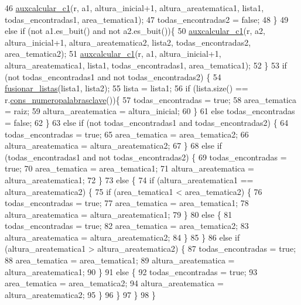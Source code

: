 \begin{DoxyCode}
46       \hyperlink{class_esquema_a77210c8349dc7dccbaa8224c2da4e50e}{auxcalcular\_c1}(r, a1, altura\_inicial+1, altura\_areatematica1, lista1, 
      todas\_encontradas1, area\_tematica1); 
47       todas\_encontradas2 = \textcolor{keyword}{false};
48   \}
49   \textcolor{keywordflow}{else} \textcolor{keywordflow}{if} (not a1.es\_buit() and not a2.es\_buit())\{
50       \hyperlink{class_esquema_a77210c8349dc7dccbaa8224c2da4e50e}{auxcalcular\_c1}(r, a2, altura\_inicial+1, altura\_areatematica2, lista2, 
      todas\_encontradas2, area\_tematica2);
51       \hyperlink{class_esquema_a77210c8349dc7dccbaa8224c2da4e50e}{auxcalcular\_c1}(r, a1, altura\_inicial+1, altura\_areatematica1, lista1, 
      todas\_encontradas1, area\_tematica1); 
52   \}
53   \textcolor{keywordflow}{if} (not todas\_encontradas1 and not todas\_encontradas2) \{
54       \hyperlink{class_esquema_abf74b66701d3ab70316d8740cdd0bc25}{fusionar\_listas}(lista1, lista2);
55       lista = lista1;
56       \textcolor{keywordflow}{if} (lista.size() == r.\hyperlink{class_revista_a69d99a64d3ef987db733b4f492c53db8}{cons\_numeropalabrasclave}())\{  
57     todas\_encontradas = \textcolor{keyword}{true};
58     area\_tematica = raiz;
59     altura\_areatematica = altura\_inicial;
60       \}
61       \textcolor{keywordflow}{else} todas\_encontradas = \textcolor{keyword}{false};
62   \}
63   \textcolor{keywordflow}{else} \textcolor{keywordflow}{if} (not todas\_encontradas1 and todas\_encontradas2) \{
64       todas\_encontradas = \textcolor{keyword}{true};
65       area\_tematica = area\_tematica2;
66       altura\_areatematica = altura\_areatematica2;
67   \}
68   \textcolor{keywordflow}{else} \textcolor{keywordflow}{if} (todas\_encontradas1 and not todas\_encontradas2) \{
69       todas\_encontradas = \textcolor{keyword}{true};
70       area\_tematica = area\_tematica1;
71       altura\_areatematica = altura\_areatematica1;
72   \}
73   \textcolor{keywordflow}{else} \{
74       \textcolor{keywordflow}{if} (altura\_areatematica1 == altura\_areatematica2) \{
75     \textcolor{keywordflow}{if} (area\_tematica1 < area\_tematica2) \{
76         todas\_encontradas = \textcolor{keyword}{true};
77         area\_tematica = area\_tematica1;
78         altura\_areatematica = altura\_areatematica1;
79     \}
80     \textcolor{keywordflow}{else} \{
81         todas\_encontradas = \textcolor{keyword}{true};
82         area\_tematica = area\_tematica2;
83         altura\_areatematica = altura\_areatematica2;
84     \}
85       \}
86       \textcolor{keywordflow}{else} \textcolor{keywordflow}{if} (altura\_areatematica1 > altura\_areatematica2) \{
87     todas\_encontradas = \textcolor{keyword}{true};
88     area\_tematica = area\_tematica1;
89     altura\_areatematica = altura\_areatematica1;
90       \}
91       \textcolor{keywordflow}{else} \{
92     todas\_encontradas = \textcolor{keyword}{true};
93     area\_tematica = area\_tematica2;
94     altura\_areatematica = altura\_areatematica2;
95       \}
96   \}
97     \}
98 \}
\end{DoxyCode}
